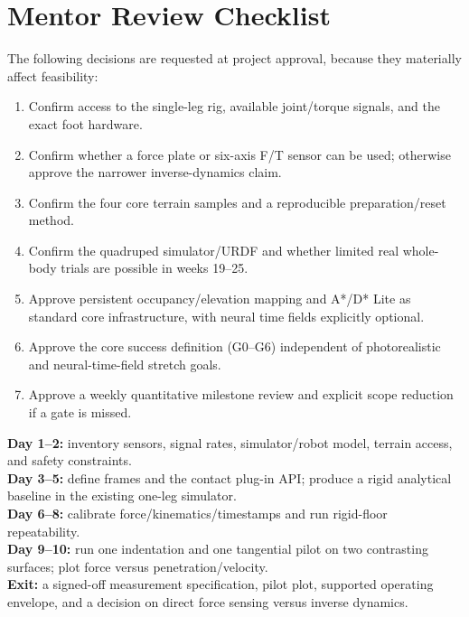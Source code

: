 \section{Mentor Review Checklist}
\label{app:checklist}

The following decisions are requested at project approval, because they materially affect feasibility:
\begin{enumerate}
  \item Confirm access to the single-leg rig, available joint/torque signals, and the exact foot hardware.
  \item Confirm whether a force plate or six-axis F/T sensor can be used; otherwise approve the narrower inverse-dynamics claim.
  \item Confirm the four core terrain samples and a reproducible preparation/reset method.
  \item Confirm the quadruped simulator/URDF and whether limited real whole-body trials are possible in weeks 19--25.
  \item Approve persistent occupancy/elevation mapping and A*/D* Lite as standard core infrastructure, with neural time fields explicitly optional.
  \item Approve the core success definition (G0--G6) independent of photorealistic and neural-time-field stretch goals.
  \item Approve a weekly quantitative milestone review and explicit scope reduction if a gate is missed.
\end{enumerate}

\begin{keybox}
\textbf{Day 1--2:} inventory sensors, signal rates, simulator/robot model, terrain access, and safety constraints.\\
\textbf{Day 3--5:} define frames and the contact plug-in API; produce a rigid analytical baseline in the existing one-leg simulator.\\
\textbf{Day 6--8:} calibrate force/kinematics/timestamps and run rigid-floor repeatability.\\
\textbf{Day 9--10:} run one indentation and one tangential pilot on two contrasting surfaces; plot force versus penetration/velocity.\\
\textbf{Exit:} a signed-off measurement specification, pilot plot, supported operating envelope, and a decision on direct force sensing versus inverse dynamics.
\end{keybox}
